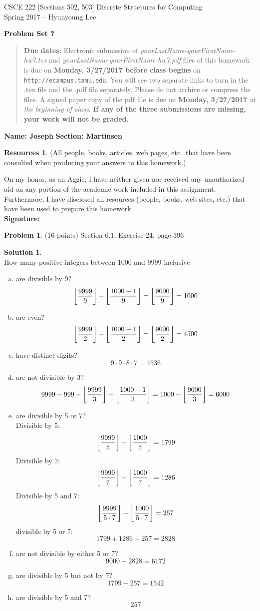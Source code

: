 \documentclass{article}
\DeclarePairedDelimiter\floor{\lfloor}{\rfloor}
\theoremstyle{definition}
\newtheorem{problem}{Problem}
\newtheorem*{solution}{Solution}
\newtheorem*{resources}{Resources}
\newcommand{\name}[2]{\noindent\textbf{Name: #1}\hfill \textbf{Section: #2}}
\newcommand{\honor}{\noindent On my honor, as an Aggie, I have neither
  given nor received any unauthorized aid on any portion of the
  academic work included in this assignment. Furthermore, I have
  disclosed all resources (people, books, web sites, etc.) that have
  been used to prepare this homework. \\[2ex]
 \textbf{Signature:} \underline{\hspace*{10cm}} }
\newcommand{\problemset}[1]{\begin{center}\textbf{Problem Set #1}\end{center}}
\newcommand{\duedate}[2]{\begin{quote}\textbf{Due dates:} Electronic
    submission of \textsl{yourLastName-yourFirstName-hw7.tex} and 
    \textsl{yourLastName-yourFirstName-hw7.pdf} files of this homework is due on
    \textbf{#1} on \texttt{http://ecampus.tamu.edu}. You will see two separate links
    to turn in the .tex file and the .pdf file separately. Please do not archive or compress the files.  
    A signed paper copy of the pdf file is due on \textbf{#2} \textsl{at the beginning of class}.
    \textbf{If any of the three submissions are missing, your work will not be graded.}\end{quote} }
\begin{document}
\vspace*{-15mm}
\begin{center}
{\large
CSCE 222 [Sections 502, 503] Discrete Structures for Computing\\[.5ex]
Spring 2017 -- Hyunyoung Lee\\}
\end{center}
\problemset{7}
\duedate{Monday, 3/27/2017 before class begins}{Monday, 3/27/2017}
\name{Joseph }{Martinsen}
\begin{resources} (All people, books, articles, web pages, etc.\ that
  have been consulted when producing your answers to this homework.)
\end{resources}
\honor

\smallskip

\begin{problem} (16 points) 
Section 6.1, Exercise 24, page 396
\end{problem}
\begin{solution} \ \\
How many positive integers between 1000 and 9999 inclusive
\begin{enumerate}[a)]
  \item are divisible by 9?
  $$\floor*{ \dfrac{9999}{9}} - \floor*{\dfrac{1000-1}{9}} = \floor*{\dfrac{9000}{9}} = 1000$$
  \item are even?
  $$\floor*{ \dfrac{9999}{2}} - \floor*{\dfrac{1000-1}{2}} = \floor*{\dfrac{9000}{2}} = 4500$$
  \item have distinct digits?
  $$9 \cdot 9 \cdot 8 \cdot 7 = 4536$$
  \item are not divisible by 3?
  $$9999-999 - \floor*{ \dfrac{9999}{3}} - \floor*{\dfrac{1000-1}{3}} = 1000 - \floor*{\dfrac{9000}{3}} = 6000$$
  \item are divisible by 5 or 7? \\
    Divisible by 5:
    $$\floor*{ \dfrac{9999}{5}} - \floor*{\dfrac{1000}{5}} = 1799$$
    Divisible by 7:
    $$\floor*{ \dfrac{9999}{7}} - \floor*{ \dfrac{1000}{7}} = 1286$$
    Divisible by 5 and 7:
    $$\floor*{ \dfrac{9999}{5\cdot7}} - \floor*{ \dfrac{1000}{5\cdot7}} = 257$$
    divisible by 5 or 7:
    $$1799+1286-257 = 2828$$
  \item are not divisible by either 5 or 7?
  $$9000- 2828 = 6172$$
  \item are divisible by 5 but not by 7?
  $$1799 - 257 = 1542$$
  \item are divisible by 5 and 7?
  $$257$$
\end{enumerate}
\end{solution}
\end{document}
